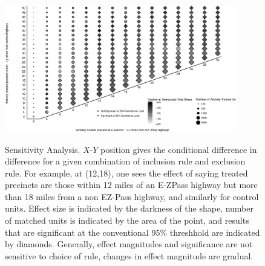 
\begin{figure}[t]
    \centering
    \includegraphics[width=0.9\textwidth]{Figures/new_style_04.eps}
    \label{fig:heatmap}
    \caption{Sensitivity Analysis. $X$-$Y$ position gives the conditional difference in difference for a given combination of inclusion rule and exclusion rule. For example, at (12,18), one sees the effect of saying treated precincts are those within 12 miles of an E-ZPass highway but more than 18 miles from a non EZ-Pass highway, and similarly for control units. Effect size is indicated by the darkness of the shape, number of matched units is indicated by the area of the point, and results that are significant at the conventional 95\% threshhold are indicated by diamonds. Generally, effect magnitudes and significance are not sensitive to choice of rule, changes in effect magnitude are gradual.}
\end{figure}